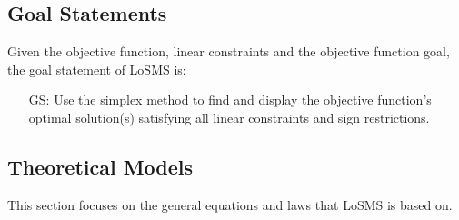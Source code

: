 \documentclass[12pt]{article}
\newcounter{goalnum} %
\newcommand{\famname}{LoSMS} %
\begin{document}
\subsection{Goal Statements}

\noindent Given the objective function, linear constraints and the objective 
function goal, the goal statement of \famname{} is: 

\begin{itemize}
	\item[GS\refstepcounter{goalnum}\thegoalnum \label{goalStatement}:] Use the 
	simplex method to find and display the objective function's optimal 
	solution(s) satisfying all linear constraints and sign restrictions.
\end{itemize}


\subsection{Theoretical Models} \label{sec_theoretical}

This section focuses on the general equations and laws that \famname{} is based
on.

~\newline
\end{document}
